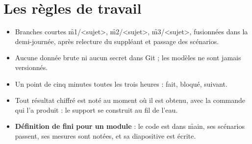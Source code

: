 \section{Les règles de travail}

\begin{itemize}
  \item Branches courtes \f{m1/<sujet>}, \f{m2/<sujet>}, \f{m3/<sujet>}, fusionnées dans la
        demi-journée, après relecture du suppléant et passage des scénarios.
  \item Aucune donnée brute ni aucun secret dans Git ; les modèles ne sont jamais versionnés.
  \item Un point de cinq minutes toutes les trois heures : fait, bloqué, suivant.
  \item Tout résultat chiffré est noté au moment où il est obtenu, avec la commande qui l'a
        produit : le support se construit au fil de l'eau.
  \item \textbf{Définition de \og fini \fg{} pour un module} : le code est dans \f{main}, ses
        scénarios passent, ses mesures sont notées, et sa diapositive est écrite.
\end{itemize}
